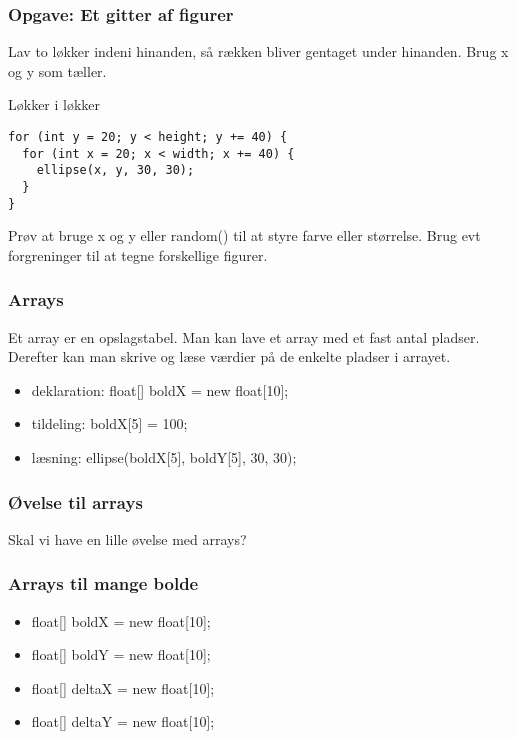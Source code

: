 \documentclass{beamer}
\begin{document}
\begin{frame}[fragile]
  \frametitle{Opgave: Et gitter af figurer}

  Lav to løkker indeni hinanden, så rækken bliver gentaget under hinanden. Brug x og y som tæller. 
  
  \begin{block}{Løkker i løkker}    
\begin{verbatim}
for (int y = 20; y < height; y += 40) {
  for (int x = 20; x < width; x += 40) {
    ellipse(x, y, 30, 30);
  }
}
\end{verbatim}  
  \end{block}
  
Prøv at bruge x og y eller random() til at styre farve eller størrelse. Brug evt forgreninger til at tegne forskellige figurer.
  
\end{frame}


\begin{frame}[fragile]
  \frametitle{Arrays}
  
  Et array er en opslagstabel. Man kan lave et array med et fast antal pladser.
  Derefter kan man skrive og læse værdier på de enkelte pladser i arrayet.
  
  \begin{itemize}
  \item deklaration: float[] boldX = new float[10];
  \item tildeling: boldX[5] = 100; 
  \item læsning: ellipse(boldX[5], boldY[5], 30, 30);
  \end{itemize}
  
\end{frame}


\begin{frame}[fragile]
  \frametitle{Øvelse til arrays}
  
  Skal vi have en lille øvelse med arrays?
  
\end{frame}

\begin{frame}[fragile]
  \frametitle{Arrays til mange bolde}
 
  \begin{itemize}
  \item float[] boldX = new float[10];
  \item float[] boldY = new float[10];
  \item float[] deltaX = new float[10];
  \item float[] deltaY = new float[10];
  \end{itemize}
  
\end{frame}
\end{document}
